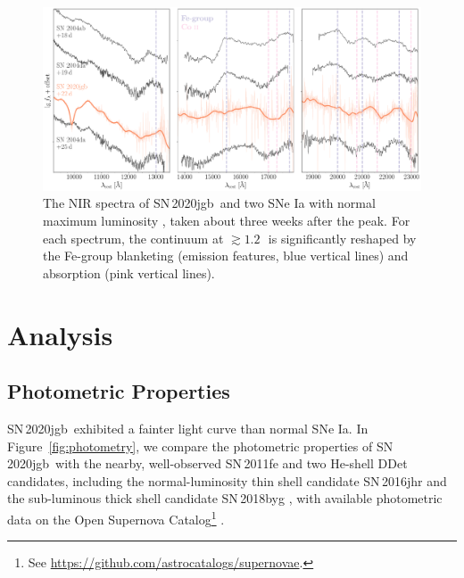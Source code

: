 \documentclass[twocolumn]{aastex631}
\newcommand{\sn}{SN\,2020jgb}
\begin{document}
\begin{figure}
    \centering
    \includegraphics[width=\textwidth]{NIR_spec.pdf}
    \caption{The NIR spectra of \sn\ and two SNe Ia with normal maximum luminosity \citep[SN\,2004ab and SN\,2004da,][]{Marion2009_NIR}, taken about three weeks after the peak. For each spectrum, the continuum at $\gtrsim1.2$\,\micron\ is significantly reshaped by the Fe-group blanketing (emission features, blue vertical lines) and  absorption (pink vertical lines).}
    \label{fig:NIR_spec}
\end{figure}

\section{Analysis} \label{sec:analysis}
\subsection{Photometric Properties}
\sn\ exhibited a fainter light curve than normal SNe Ia. In Figure~\ref{fig:photometry}, we compare the photometric properties of \sn\ with the nearby, well-observed SN\,2011fe \citep{Nugent_11fe_2011} and two He-shell DDet candidates, including the normal-luminosity thin shell candidate SN\,2016jhr \citep{jiang_16jhr_2017} and the sub-luminous thick shell candidate SN\,2018byg \citep{de_18byg_2019}, with available photometric data on the Open Supernova Catalog\footnote{See \url{https://github.com/astrocatalogs/supernovae}.} \citep{Guillochon_2017}.
\end{document}
